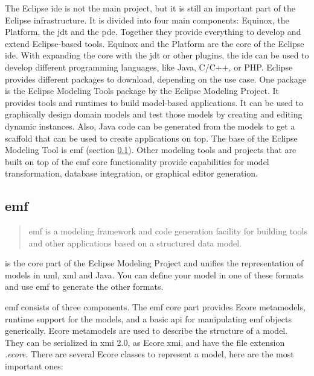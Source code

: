   The Eclipse \ac{ide} is not the main project, but it is still an important part of the Eclipse infrastructure. It is divided into four main components: Equinox, the Platform, the \ac{jdt} and the \ac{pde}. Together they provide everything to develop and extend Eclipse-based tools. Equinox and the Platform are the core of the Eclipse \ac{ide}. With expanding the core with the \ac{jdt} or other plugins, the \ac{ide} can be used to develop different programming languages, like Java, C/C++, or PHP. \cite{emf} Eclipse provides different packages to download, depending on the use case. One package is the Eclipse Modeling Tools package by the Eclipse Modeling Project. It provides tools and runtimes to build model-based applications. It can be used to graphically design domain models and test those models by creating and editing dynamic instances. Also, Java code can be generated from the models to get a scaffold that can be used to create applications on top. \cite{eclipse_modeling} The base of the Eclipse Modeling Tool is \ac{emf} (section \ref{subsec:emf}). Other modeling tools and projects that are built on top of the \ac{emf} core functionality provide capabilities for model transformation, database integration, or graphical editor generation. \cite{emf}

  \subsection{\acf{emf}}
    \label{subsec:emf}

    \begin{quote}
      \glqq\acf{emf} is a modeling framework and code generation facility for building tools and other applications based on a structured data model.\grqq{} \autocite{emf-repo}
    \end{quote}

     is the core part of the Eclipse Modeling Project and unifies the representation of models in \acs{uml}, \acs{xml} and Java. You can define your model in one of these formats and use \ac{emf} to generate the other formats.
    
    \ac{emf} consists of three components. The \ac{emf} core part provides Ecore metamodels, runtime support for the models, and a basic \acs{api} for manipulating \ac{emf} objects generically. Ecore metamodels are used to describe the structure of a model. \cite{eclipse_emf} They can be serialized in \ac{xmi} 2.0, as Ecore \ac{xmi}, and have the file extension \textit{.ecore}. There are several Ecore classes to represent a model, here are the most important ones:

